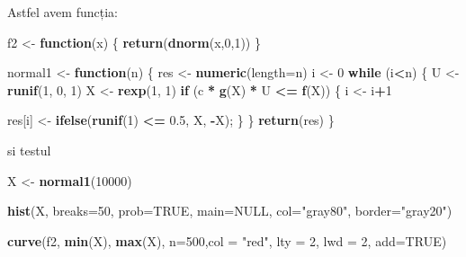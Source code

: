 \documentclass[]{article}
\newenvironment{Shaded}{\begin{snugshade}}{\end{snugshade}}
\newcommand{\KeywordTok}[1]{\textcolor[rgb]{0.13,0.29,0.53}{\textbf{#1}}}
\newcommand{\DataTypeTok}[1]{\textcolor[rgb]{0.13,0.29,0.53}{#1}}
\newcommand{\DecValTok}[1]{\textcolor[rgb]{0.00,0.00,0.81}{#1}}
\newcommand{\FloatTok}[1]{\textcolor[rgb]{0.00,0.00,0.81}{#1}}
\newcommand{\StringTok}[1]{\textcolor[rgb]{0.31,0.60,0.02}{#1}}
\newcommand{\OtherTok}[1]{\textcolor[rgb]{0.56,0.35,0.01}{#1}}
\newcommand{\ControlFlowTok}[1]{\textcolor[rgb]{0.13,0.29,0.53}{\textbf{#1}}}
\newcommand{\OperatorTok}[1]{\textcolor[rgb]{0.81,0.36,0.00}{\textbf{#1}}}
\newcommand{\NormalTok}[1]{#1}
\begin{document}
Astfel avem funcția:

\begin{Shaded}
\begin{Highlighting}[]
\NormalTok{f2 <-}\StringTok{ }\ControlFlowTok{function}\NormalTok{(x) \{}
  \KeywordTok{return}\NormalTok{(}\KeywordTok{dnorm}\NormalTok{(x,}\DecValTok{0}\NormalTok{,}\DecValTok{1}\NormalTok{))}
\NormalTok{\}}

\NormalTok{normal1 <-}\StringTok{ }\ControlFlowTok{function}\NormalTok{(n) \{}
\NormalTok{  res <-}\StringTok{ }\KeywordTok{numeric}\NormalTok{(}\DataTypeTok{length=}\NormalTok{n)}
\NormalTok{  i <-}\StringTok{ }\DecValTok{0}
  \ControlFlowTok{while}\NormalTok{ (i}\OperatorTok{<}\NormalTok{n) \{}
\NormalTok{    U <-}\StringTok{ }\KeywordTok{runif}\NormalTok{(}\DecValTok{1}\NormalTok{, }\DecValTok{0}\NormalTok{, }\DecValTok{1}\NormalTok{)}
\NormalTok{    X <-}\StringTok{ }\KeywordTok{rexp}\NormalTok{(}\DecValTok{1}\NormalTok{, }\DecValTok{1}\NormalTok{)}
    \ControlFlowTok{if}\NormalTok{ (c }\OperatorTok{*}\StringTok{ }\KeywordTok{g}\NormalTok{(X) }\OperatorTok{*}\StringTok{ }\NormalTok{U }\OperatorTok{<=}\StringTok{ }\KeywordTok{f}\NormalTok{(X)) \{}
\NormalTok{      i <-}\StringTok{ }\NormalTok{i}\OperatorTok{+}\DecValTok{1}
      
\NormalTok{      res[i] <-}\StringTok{ }\KeywordTok{ifelse}\NormalTok{(}\KeywordTok{runif}\NormalTok{(}\DecValTok{1}\NormalTok{) }\OperatorTok{<=}\StringTok{ }\FloatTok{0.5}\NormalTok{, X, }\OperatorTok{-}\NormalTok{X);}
\NormalTok{    \}}
\NormalTok{  \}}
  \KeywordTok{return}\NormalTok{(res)}
\NormalTok{\}}
\end{Highlighting}
\end{Shaded}

si testul

\begin{Shaded}
\begin{Highlighting}[]
\NormalTok{X <-}\StringTok{ }\KeywordTok{normal1}\NormalTok{(}\DecValTok{10000}\NormalTok{)}

\KeywordTok{hist}\NormalTok{(X, }\DataTypeTok{breaks=}\DecValTok{50}\NormalTok{, }
     \DataTypeTok{prob=}\OtherTok{TRUE}\NormalTok{, }
     \DataTypeTok{main=}\OtherTok{NULL}\NormalTok{, }
     \DataTypeTok{col=}\StringTok{"gray80"}\NormalTok{, }\DataTypeTok{border=}\StringTok{"gray20"}\NormalTok{)}

\KeywordTok{curve}\NormalTok{(f2, }\KeywordTok{min}\NormalTok{(X), }\KeywordTok{max}\NormalTok{(X), }\DataTypeTok{n=}\DecValTok{500}\NormalTok{,}\DataTypeTok{col =} \StringTok{"red"}\NormalTok{, }\DataTypeTok{lty =} \DecValTok{2}\NormalTok{, }\DataTypeTok{lwd =} \DecValTok{2}\NormalTok{, }\DataTypeTok{add=}\OtherTok{TRUE}\NormalTok{)}
\end{Highlighting}
\end{Shaded}
\end{document}
